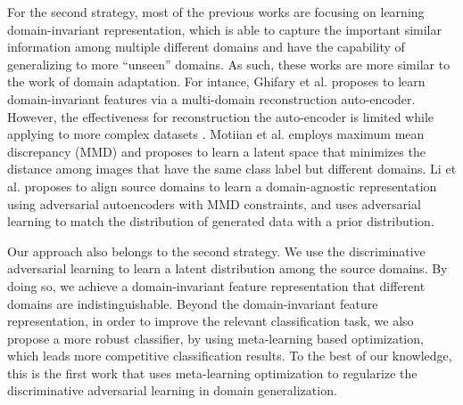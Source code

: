 \documentclass[twocolumn,preprint]{elsarticle}
\begin{document}
For the second strategy, most of the previous works are focusing on learning domain-invariant representation, which is able to capture the important similar information among multiple different domains and have the capability of generalizing to more ``unseen'' domains. 
As such, these works are more similar to the work of domain adaptation. 
For intance, Ghifary et al. \cite{mtae} proposes to learn domain-invariant features via a multi-domain reconstruction auto-encoder. However, the effectiveness for reconstruction the auto-encoder is limited while applying to more complex datasets \cite{tf}. 
Motiian et al.\cite{ccsa} employs maximum mean discrepancy (MMD) and proposes to learn a latent space that minimizes the distance among images that have the same class label but different domains.
Li et al. \cite{mmd-aae} proposes to align source domains to learn a domain-agnostic representation using adversarial autoencoders with MMD constraints, and uses adversarial learning to match the distribution of generated data with a prior distribution.


Our approach also belongs to the second strategy. We use the discriminative adversarial learning to learn a latent distribution among the source domains. By doing so, we achieve a domain-invariant feature representation that different domains are indistinguishable. Beyond the domain-invariant feature representation, in order to improve the relevant classification task, we also propose a more robust classifier, by using meta-learning based optimization, which leads more competitive classification results. To the best of our knowledge, this is the first work that uses meta-learning optimization to regularize the discriminative adversarial learning in domain generalization.
\end{document}
